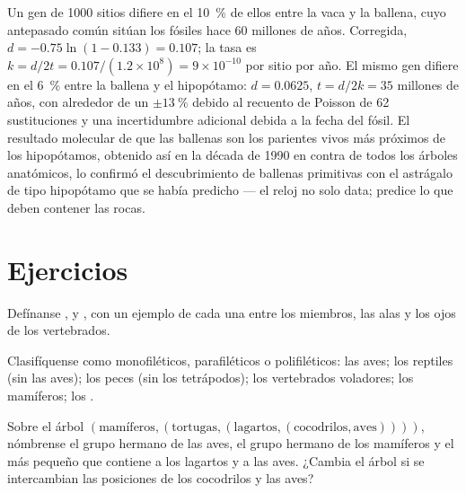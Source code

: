 \begin{example}\label{ex:b2:phylogenetic-trees:dating}
Un gen de \num{1000} sitios difiere en el \qty{10}{\%} de ellos entre la
vaca y la ballena, cuyo antepasado común sitúan los fósiles hace 60
millones de años. Corregida, $d = -0.75\ln(1 - 0.133) = 0.107$; la tasa es $k
= d/2t = 0.107/(1.2\times 10^{8}) = 9\times 10^{-10}$ por sitio por
año. El mismo gen difiere en el \qty{6}{\%} entre la ballena y el
hipopótamo: $d = 0.0625$, $t = d/2k = 35$ millones de años, con alrededor
de un $\pm
\qty{13}{\%}$ debido al recuento de Poisson de 62 sustituciones y una
incertidumbre adicional debida a la fecha del fósil. El resultado
molecular de que las ballenas son los parientes vivos más próximos de los
hipopótamos, obtenido así en la década de 1990 en contra de todos los
árboles anatómicos, lo confirmó el descubrimiento de ballenas primitivas
con el astrágalo de tipo hipopótamo que se había predicho --- el reloj no
solo data; predice lo que deben contener las rocas.
\end{example}

\section{Ejercicios}

\begin{exercise}[$\star$]\label{exo:b2:phylogenetic-trees:1}
Defínanse ,  y , con un ejemplo de cada una
entre los miembros, las alas y los ojos de los vertebrados.
\end{exercise}

\begin{exercise}[$\star$]\label{exo:b2:phylogenetic-trees:2}
Clasifíquense como monofiléticos, parafiléticos o polifiléticos: las aves;
los reptiles (sin las aves); los peces (sin los tetrápodos); los
vertebrados voladores; los mamíferos; los .
\end{exercise}

\begin{exercise}[$\star$]\label{exo:b2:phylogenetic-trees:3}
Sobre el árbol $(\text{mamíferos},(\text{tortugas},(\text{lagartos},
(\text{cocodrilos},\text{aves}))))$, nómbrense el grupo hermano de las
aves, el grupo hermano de los mamíferos y el  más pequeño que
contiene a los lagartos y a las aves. ¿Cambia el árbol si se intercambian
las posiciones de los cocodrilos y las aves?
\end{exercise}

